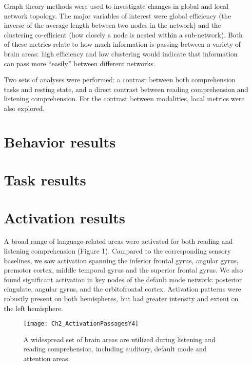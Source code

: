 Graph theory methods were used to investigate changes in global and local network topology. The major variables of interest were global efficiency (the inverse of the average length between two nodes in the network) and the clustering co-efficient (how closely a node is nested within a sub-network). Both of these metrics relate to how much information is passing between a variety of brain areas: high efficiency and low clustering would indicate that information can pass more “easily” between different networks. 

Two sets of analyses were performed: a contrast between both comprehension tasks and resting state, and a direct contrast between reading comprehension and listening comprehension. For the contrast between modalities, local metrics were also explored.

\section{Behavior results}

\section{Task results}



\section{Activation results}

A broad range of language-related areas were activated for both reading and listening comprehension (Figure 1). Compared to the corresponding sensory baselines, we saw activation spanning the inferior frontal gyrus, angular gyrus, premotor cortex, middle temporal gyrus and the superior frontal gyrus. We also found significant activation in key nodes of the default mode network: posterior cingulate, angular gyrus, and the orbitofrontal cortex. Activation patterns were robustly present on both hemispheres, but had greater intensity and extent on the left hemisphere. 

\begin{figure}[tp]
\centering
\texttt{[image: Ch2\_ActivationPassagesY4]}
    \caption[Language comprehension spans many brain areas.]{A widespread set of brain areas are utilized during listening and reading comprehension, including auditory, default mode and attention areas.}
\label{fig:ch2_passages}
\end{figure}

